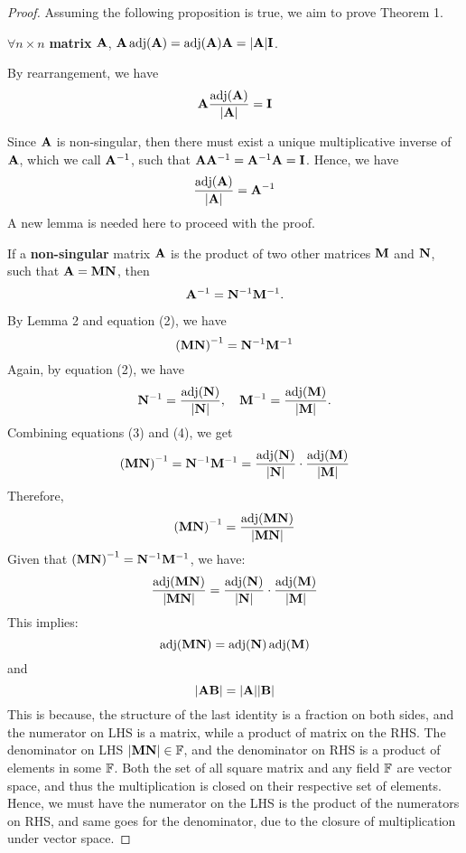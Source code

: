 \documentclass[12pt,a4paper]{article}
\begin{document}
\begin{proof}
    Assuming the following proposition is true, we aim to prove Theorem 1.
    \begin{lemma}\label{inv}
      \label{scalarI}  $\forall n \times n$ \textbf{ matrix} \(\mathbf{A}\), \(\mathbf{A}\operatorname{adj}(\mathbf{A})=\operatorname{adj}(\mathbf{A})\mathbf{A} =|\mathbf{A}|\mathbf{I}\).
    \end{lemma}
    By rearrangement, we have 
    \begin{equation}
    \mathbf{A}\frac{\operatorname{adj}(\mathbf{A})}{|\mathbf{A}|} = \mathbf{I}
    \end{equation}
    
    Since \(\mathbf{A}\) is non-singular, then there must exist a unique multiplicative inverse of \(\mathbf{A}\), which we call \(\mathbf{A}^{-1}\), such that \(\mathbf{A}\mathbf{A}^{-1} = \mathbf{A}^{-1}\mathbf{A} = \mathbf{I}\). Hence, we have
    \begin{equation}
        \frac{\operatorname{adj}(\mathbf{A})}{|\mathbf{A}|} = \mathbf{A}^{-1}
    \end{equation}
A new lemma is needed here to proceed with the proof.
\begin{lemma}
    \label{Inverse_o_Product}If a \textbf{non-singular} matrix \(\mathbf{A}\) is the product of two other matrices \(\mathbf{M}\) and \(\mathbf{N}\), such that \(\mathbf{A = MN}\), then 
    \[
    \mathbf{A}^{-1} =  \mathbf{N}^{-1}\mathbf{M}^{-1}.
    \]
\end{lemma}
    By Lemma 2 and equation (2), we have 
    \begin{equation}
        \left(\mathbf{MN}\right)^{-1} = \mathbf{N}^{-1}\mathbf{M}^{-1}
    \end{equation}
    Again, by equation (2), we have 
    \begin{equation}
        \mathbf{N}^{-1} = \frac{\operatorname{adj}(\mathbf{N})}{|\mathbf{N}|},  
        \quad \mathbf{M}^{-1} = \frac{\operatorname{adj}(\mathbf{M})}{|\mathbf{M}|}.
    \end{equation}
    Combining equations (3) and (4), we get
    \[
    \left(\mathbf{MN}\right)^{-1} = \mathbf{N}^{-1}\mathbf{M}^{-1} = \frac{\operatorname{adj}(\mathbf{N})}{|\mathbf{N}|} \cdot \frac{\operatorname{adj}(\mathbf{M})}{|\mathbf{M}|}
    \]
    Therefore, 
    \[
    \left(\mathbf{MN}\right)^{-1} = \frac{\operatorname{adj}(\mathbf{MN})}{|\mathbf{MN}|}
    \]
    Given that \(\left(\mathbf{MN}\right)^{-1} = \mathbf{N}^{-1}\mathbf{M}^{-1}\), we have:
    \[
    \frac{\operatorname{adj}(\mathbf{MN})}{|\mathbf{MN}|} = \frac{\operatorname{adj}(\mathbf{N})}{|\mathbf{N}|} \cdot \frac{\operatorname{adj}(\mathbf{M})}{|\mathbf{M}|}
    \]
    This implies:
    \[
    \operatorname{adj}(\mathbf{MN}) = \operatorname{adj}(\mathbf{N}) \operatorname{adj}(\mathbf{M})
    \]
    and
    \[
    |\mathbf{A}\mathbf{B}| = |\mathbf{A}||\mathbf{B}|
    \]
    This is because, the structure of the last identity is a fraction on both sides, and the numerator on LHS is a matrix, while a product of matrix on the RHS. The denominator on LHS $|\mathbf{MN}|\in \mathbb{F}$, and the denominator on RHS is a product of elements in some $\mathbb{F}$. Both the set of all square matrix and any field $\mathbb{F}$ are vector space, and thus the multiplication is closed on their respective set of elements. Hence, we must have the numerator on the LHS is the product of the numerators on RHS, and same goes for the denominator, due to the closure of multiplication under vector space.


\end{proof}
\end{document}

